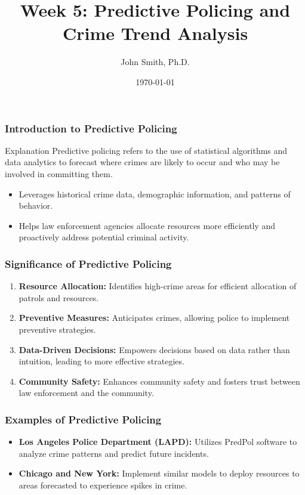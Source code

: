 \documentclass[aspectratio=169]{beamer}
\title[Academic Template]{Week 5: Predictive Policing and Crime Trend Analysis}
\author[J. Smith]{John Smith, Ph.D.}
\institute[University Name]{
  Department of Computer Science\\
  University Name\\
  \vspace{0.3cm}
  Email: email@university.edu\\
  Website: www.university.edu
}
\date{\today}
\begin{document}
\frame{\titlepage}

\begin{frame}[fragile]
    \frametitle{Introduction to Predictive Policing}
    \begin{block}{Explanation}
        Predictive policing refers to the use of statistical algorithms and data analytics to forecast where crimes are likely to occur and who may be involved in committing them.
    \end{block}
    \begin{itemize}
        \item Leverages historical crime data, demographic information, and patterns of behavior.
        \item Helps law enforcement agencies allocate resources more efficiently and proactively address potential criminal activity.
    \end{itemize}
\end{frame}

\begin{frame}[fragile]
    \frametitle{Significance of Predictive Policing}
    \begin{enumerate}
        \item \textbf{Resource Allocation:} Identifies high-crime areas for efficient allocation of patrols and resources.
        \item \textbf{Preventive Measures:} Anticipates crimes, allowing police to implement preventive strategies.
        \item \textbf{Data-Driven Decisions:} Empowers decisions based on data rather than intuition, leading to more effective strategies.
        \item \textbf{Community Safety:} Enhances community safety and fosters trust between law enforcement and the community.
    \end{enumerate}
\end{frame}

\begin{frame}[fragile]
    \frametitle{Examples of Predictive Policing}
    \begin{itemize}
        \item \textbf{Los Angeles Police Department (LAPD):} Utilizes PredPol software to analyze crime patterns and predict future incidents.
        \item \textbf{Chicago and New York:} Implement similar models to deploy resources to areas forecasted to experience spikes in crime.
    \end{itemize}
\end{frame}
\end{document}
